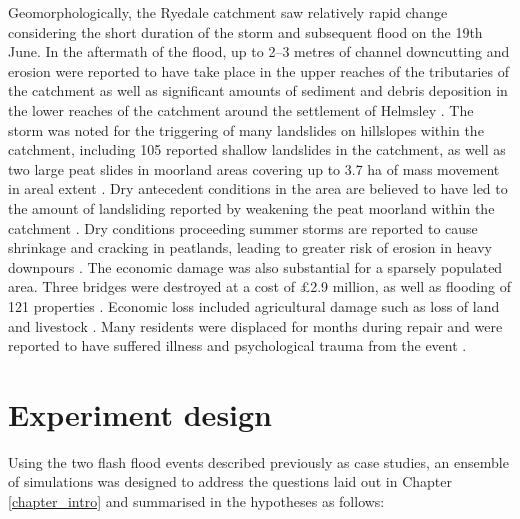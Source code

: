 Geomorphologically, the Ryedale catchment saw relatively rapid change considering the short duration of the storm and subsequent flood on the 19th June. In the aftermath of the flood, up to 2--3 metres of channel downcutting and erosion were reported to have take place in the upper reaches of the tributaries of the catchment \citep{hopkins2012knowledge,wass2008investigation} as well as significant amounts of sediment and debris deposition in the lower reaches of the catchment around the settlement of Helmsley \citep{hopkins2012knowledge}. The storm was noted for the triggering of many landslides on hillslopes within the catchment, including 105 reported shallow landslides in the catchment, as well as two large peat slides in moorland areas covering up to 3.7 ha of mass movement in areal extent \citep{galiatsatos2007assessment,wass2008investigation}. Dry antecedent conditions in the area are believed to have led to the amount of landsliding reported by weakening the peat moorland within the catchment \citep{sibley2009analysis}. Dry conditions proceeding summer storms are reported to cause shrinkage and cracking in peatlands, leading to greater risk of erosion in heavy downpours \citep{warburton2004hydrological}. 
The economic damage was also substantial for a sparsely populated area. Three bridges were destroyed at a cost of £2.9 million, as well as flooding of 121 properties \citep{wass2008investigation}. Economic loss included agricultural damage such as loss of land and livestock \citep{sibley2009analysis}. Many residents were displaced for months during repair and were reported to have suffered illness and psychological trauma from the event \citep{hopkins2012knowledge}.



\section{Experiment design}
\label{section_experiment_design}

Using the two flash flood events described previously as case studies, an ensemble of simulations was designed to address the questions laid out in Chapter \ref{chapter_intro} and summarised in the hypotheses as follows:

